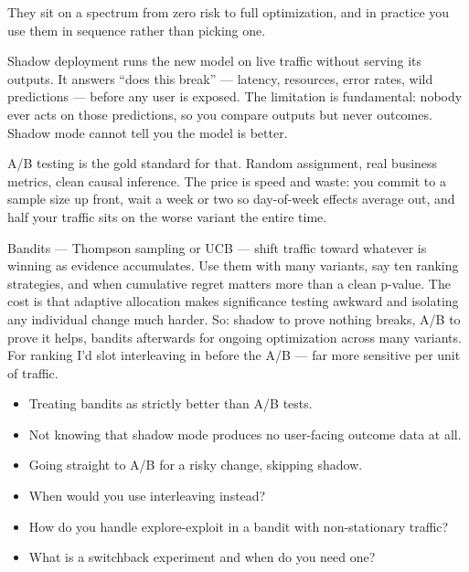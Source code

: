 \documentclass[10pt,twoside]{book}
\newcommand{\lab}[1]{\par\vspace{5pt}\noindent{\sffamily\footnotesize\bfseries\color{accent}#1}\par\vspace{1pt}}
\newcommand{\flab}[1]{\par\vspace{5pt}\noindent{\sffamily\footnotesize\bfseries\color{flag}#1}\par\vspace{1pt}}
\begin{document}
\lab{Say this}
They sit on a spectrum from zero risk to full optimization, and in practice you use them in sequence rather than picking one.\par\vspace{3pt}
Shadow deployment runs the new model on live traffic without serving its outputs. It answers ``does this break'' --- latency, resources, error rates, wild predictions --- before any user is exposed. The limitation is fundamental: nobody ever acts on those predictions, so you compare outputs but never outcomes. Shadow mode cannot tell you the model is better.\par\vspace{3pt}
A/B testing is the gold standard for that. Random assignment, real business metrics, clean causal inference. The price is speed and waste: you commit to a sample size up front, wait a week or two so day-of-week effects average out, and half your traffic sits on the worse variant the entire time.\par\vspace{3pt}
Bandits --- Thompson sampling or UCB --- shift traffic toward whatever is winning as evidence accumulates. Use them with many variants, say ten ranking strategies, and when cumulative regret matters more than a clean p-value. The cost is that adaptive allocation makes significance testing awkward and isolating any individual change much harder. So: shadow to prove nothing breaks, A/B to prove it helps, bandits afterwards for ongoing optimization across many variants. For ranking I'd slot interleaving in before the A/B --- far more sensitive per unit of traffic.\par\vspace{3pt}
\flab{Loses the signal}
\begin{itemize}
\item Treating bandits as strictly better than A/B tests.
\item Not knowing that shadow mode produces no user-facing outcome data at all.
\item Going straight to A/B for a risky change, skipping shadow.
\end{itemize}
\lab{Then they ask}
\begin{itemize}
\item When would you use interleaving instead?
\item How do you handle explore-exploit in a bandit with non-stationary traffic?
\item What is a switchback experiment and when do you need one?
\end{itemize}
\end{document}
